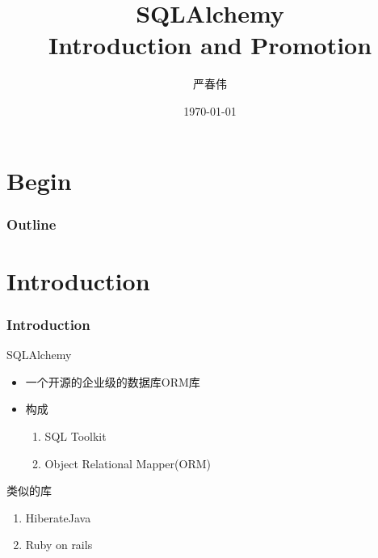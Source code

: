 \documentclass{beamer}
\title{SQLAlchemy\\ Introduction and Promotion}
\author{严春伟}
\institute[PKUSZ]{
    互联网研发中心\\
}
\date{\today}
\begin{document}
\begin{frame}
  \titlepage
\end{frame}

\section{Begin}
\begin{frame}
\frametitle{Outline}
\tableofcontents
\end{frame}

\section{Introduction}
\begin{frame}
\frametitle{Introduction}
\begin{block}{SQLAlchemy}
\begin{itemize}
    \item 一个开源的企业级的数据库ORM库
    \item 构成
    \begin{enumerate}
        \item SQL Toolkit
        \item Object Relational Mapper(ORM)
    \end{enumerate}
\end{itemize}
\end{block}

\begin{block}{类似的库}
    \begin{enumerate}
        \item Hiberate\quad Java
        \item Ruby on rails
    \end{enumerate}
\end{block}
\end{frame}
\end{document}
